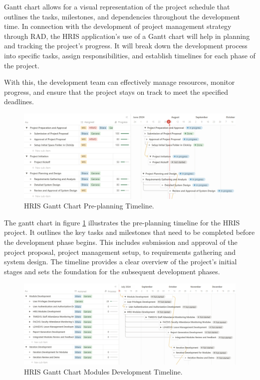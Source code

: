     Gantt chart allows for a visual representation of the project schedule that outlines the tasks, milestones, and dependencies throughout the development time. In connection with the development of project management strategy through RAD, the HRIS application's use of a Gantt chart will help in planning and tracking the project's progress. It will break down the development process into specific tasks, assign responsibilities, and establish timelines for each phase of the project.
    
    With this, the development team can effectively manage resources, monitor progress, and ensure that the project stays on track to meet the specified deadlines.

    \begin{figure}[H]
        \centering
        \includegraphics[width=1\linewidth]{figures/images/diagrams/gantt/gantt-chart-1.png}
        \caption{HRIS Gantt Chart Pre-planning Timeline.}
        \label{fig:gantt-chart-1}
    \end{figure}

    The gantt chart in figure \ref{fig:gantt-chart-1} illustrates the pre-planning timeline for the HRIS project. It outlines the key tasks and milestones that need to be completed before the development phase begins. This includes submission and approval of the project proposal, project management setup, to requirements gathering and system design. The timeline provides a clear overview of the project's initial stages and sets the foundation for the subsequent development phases.

    \begin{figure}[H]
        \centering
        \includegraphics[width=1\linewidth]{figures/images/diagrams/gantt/gantt-chart-2.png}
        \caption{HRIS Gantt Chart Modules Development Timeline.}
        \label{fig:gantt-chart-2}
    \end{figure}

